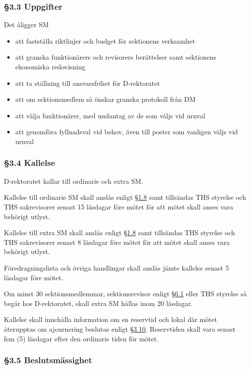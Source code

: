 \subsubsection{§3.3 Uppgifter}

Det åligger SM

\begin{itemize}
  \item att fastställa riktlinjer och budget för sektionens verksamhet
  \item att granska funktionärers och revisorers berättelser samt sektionens ekonomiska redovisning
  \item att ta ställning till ansvarsfrihet för D-rektoratet
  \item att om sektionsmedlem så önskar granska protokoll från DM
  \item att välja funktionärer, med undantag av de som väljs vid urnval
  \item att genomföra fyllnadsval vid behov, även till poster som vanligen väljs vid urnval
\end{itemize}

\subsubsection{§3.4 Kallelse}

D-rektoratet kallar till ordinarie och extra SM.

Kallelse till ordinarie SM skall anslås enligt \href{#officiella_informationskanaler}{§1.8} samt tillsändas THS styrelse och THS sakrevisorer senast 15 läsdagar före mötet för att mötet skall anses vara behörigt utlyst.

Kallelse till extra SM skall anslås enligt \href{#officiella_informationskanaler}{§1.8} samt tillsändas THS styrelse och THS sakrevisorer senast 8 läsdagar före mötet för att mötet skall anses vara behörigt utlyst.

Föredragningslista och övriga handlingar skall anslås jämte kallelse senast
5 läsdagar före mötet.

Om minst 30 sektionsmedlemmar, sektionsrevisor enligt \href{#revisorer}{§6.1} eller THS styrelse så begär hos D-rektoratet, skall extra SM hållas inom 20 läsdagar.

Kallelse skall innehålla information om en reservtid och lokal där mötet återupptas om ajournering beslutas enligt \href{#ajournering}{§3.10}. Reservtiden skall vara senast fem (5) läsdagar efter den ordinarie tiden för mötet.

\subsubsection{§3.5 Beslutsmässighet}

